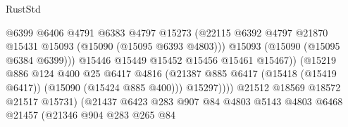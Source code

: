 \begin{lexlean}{RustStd}
\begin{coremodule}
                                              @6399
                                              @6406
                                              @4791
                                              @6383
                                              @4797
                                              @15273
                                              (@22115
                                                @6392
                                                @4797
                                                @21870
                                                @15431
                                                @15093
                                                (@15090 (@15095 @6393 @4803)))
                                              @15093
                                              (@15090 (@15095 @6384 @6399)))
                                            @15446
                                            @15449
                                            @15452
                                            @15456
                                            @15461
                                            @15467))
                                        (@15219
                                          @886
                                          @124
                                          @400
                                          @25
                                          @6417
                                          @4816
                                          (@21387
                                            @885
                                            @6417
                                            (@15418 (@15419 @6417))
                                            (@15090 (@15424 @885 @400)))
                                          @15297))))
                                  @21512
                                  @18569
                                  @18572
                                  @21517
                                  @15731)
                                (@21437
                                  @6423
                                  @283
                                  @907
                                  @84
                                  @4803
                                  @5143
                                  @4803
                                  @6468
                                  @21457
                                  (@21346
                                    @904
                                    @283
                                    @265
                                    @84

\end{coremodule}
\end{lexlean}
